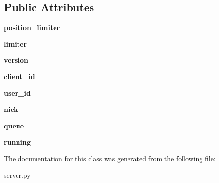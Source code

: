 \subsection*{Public Attributes}
\begin{DoxyCompactItemize}
\item 
\mbox{\label{classserver_1_1Handler_a6fa3e8df9f40dccd1de4522096781985}} 
{\bfseries position\+\_\+limiter}
\item 
\mbox{\label{classserver_1_1Handler_ad9acac2a0d248d87d74c2be5d2c9732e}} 
{\bfseries limiter}
\item 
\mbox{\label{classserver_1_1Handler_a515ccd70de8f9d2a4cbbb1c1c314837e}} 
{\bfseries version}
\item 
\mbox{\label{classserver_1_1Handler_a82fae77f6e18ca613f936302923e3910}} 
{\bfseries client\+\_\+id}
\item 
\mbox{\label{classserver_1_1Handler_a368e5ec92d1541bb7ee848835e2cdc1f}} 
{\bfseries user\+\_\+id}
\item 
\mbox{\label{classserver_1_1Handler_afe540a1acc789d4fa3bbb84f4e3c66ca}} 
{\bfseries nick}
\item 
\mbox{\label{classserver_1_1Handler_a437d5a22c96f1423facc1a87c546bfe9}} 
{\bfseries queue}
\item 
\mbox{\label{classserver_1_1Handler_a06c044d851fc4b905d6dde0f005c3860}} 
{\bfseries running}
\end{DoxyCompactItemize}


The documentation for this class was generated from the following file\+:\begin{DoxyCompactItemize}
\item 
server.\+py\end{DoxyCompactItemize}
